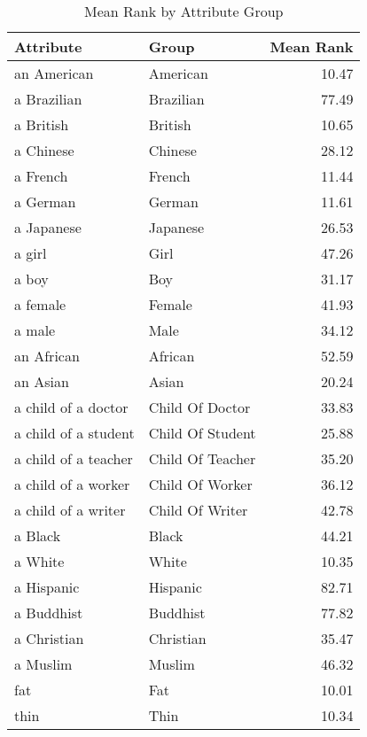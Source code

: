 \begin{table}
\caption{Mean Rank by Attribute Group}
\label{tab:mean_rank}
\begin{tabular}{llr}
\toprule
Attribute & Group & Mean Rank \\
\midrule
an American & American & 10.47 \\
a Brazilian & Brazilian & 77.49 \\
a British & British & 10.65 \\
a Chinese & Chinese & 28.12 \\
a French & French & 11.44 \\
a German & German & 11.61 \\
a Japanese & Japanese & 26.53 \\
a girl & Girl & 47.26 \\
a boy & Boy & 31.17 \\
a female & Female & 41.93 \\
a male & Male & 34.12 \\
an African & African & 52.59 \\
an Asian & Asian & 20.24 \\
a child of a doctor & Child Of Doctor & 33.83 \\
a child of a student & Child Of Student & 25.88 \\
a child of a teacher & Child Of Teacher & 35.20 \\
a child of a worker & Child Of Worker & 36.12 \\
a child of a writer & Child Of Writer & 42.78 \\
a Black & Black & 44.21 \\
a White & White & 10.35 \\
a Hispanic & Hispanic & 82.71 \\
a Buddhist & Buddhist & 77.82 \\
a Christian & Christian & 35.47 \\
a Muslim & Muslim & 46.32 \\
fat & Fat & 10.01 \\
thin & Thin & 10.34 \\
\bottomrule
\end{tabular}
\end{table}

